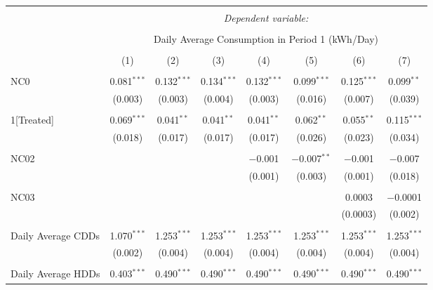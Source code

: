 
\begin{table}[!htbp] \centering 
  \caption{} 
  \label{} 
\small 
\begin{tabular}{@{\extracolsep{5pt}}lccccccc} 
\\[-1.8ex]\hline 
\hline \\[-1.8ex] 
 & \multicolumn{7}{c}{\textit{Dependent variable:}} \\ 
\cline{2-8} 
\\[-1.8ex] & \multicolumn{7}{c}{Daily Average Consumption in Period 1 (kWh/Day)} \\ 
\\[-1.8ex] & (1) & (2) & (3) & (4) & (5) & (6) & (7)\\ 
\hline \\[-1.8ex] 
 NC0 & 0.081$^{***}$ & 0.132$^{***}$ & 0.134$^{***}$ & 0.132$^{***}$ & 0.099$^{***}$ & 0.125$^{***}$ & 0.099$^{**}$ \\ 
  & (0.003) & (0.003) & (0.004) & (0.003) & (0.016) & (0.007) & (0.039) \\ 
  & & & & & & & \\ 
 1[Treated] & 0.069$^{***}$ & 0.041$^{**}$ & 0.041$^{**}$ & 0.041$^{**}$ & 0.062$^{**}$ & 0.055$^{**}$ & 0.115$^{***}$ \\ 
  & (0.018) & (0.017) & (0.017) & (0.017) & (0.026) & (0.023) & (0.034) \\ 
  & & & & & & & \\ 
 NC02 &  &  &  & $-$0.001 & $-$0.007$^{**}$ & $-$0.001 & $-$0.007 \\ 
  &  &  &  & (0.001) & (0.003) & (0.001) & (0.018) \\ 
  & & & & & & & \\ 
 NC03 &  &  &  &  &  & 0.0003 & $-$0.0001 \\ 
  &  &  &  &  &  & (0.0003) & (0.002) \\ 
  & & & & & & & \\ 
 Daily Average CDDs & 1.070$^{***}$ & 1.253$^{***}$ & 1.253$^{***}$ & 1.253$^{***}$ & 1.253$^{***}$ & 1.253$^{***}$ & 1.253$^{***}$ \\ 
  & (0.002) & (0.004) & (0.004) & (0.004) & (0.004) & (0.004) & (0.004) \\ 
  & & & & & & & \\ 
 Daily Average HDDs & 0.403$^{***}$ & 0.490$^{***}$ & 0.490$^{***}$ & 0.490$^{***}$ & 0.490$^{***}$ & 0.490$^{***}$ & 0.490$^{***}$ \\ 

\end{tabular}
\end{table}
